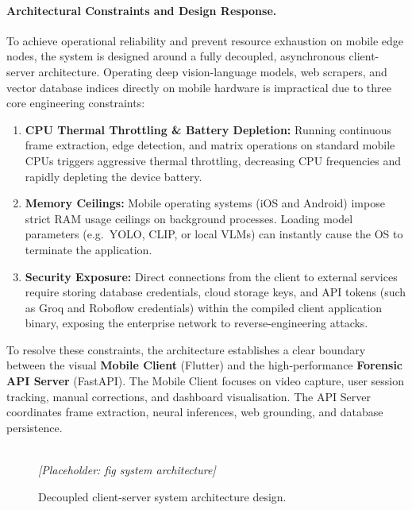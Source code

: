 \paragraph{Architectural Constraints and Design Response.}

To achieve operational reliability and prevent resource exhaustion on mobile edge nodes, the system is designed around a fully decoupled, asynchronous client-server architecture. Operating deep vision-language models, web scrapers, and vector database indices directly on mobile hardware is impractical due to three core engineering constraints:

\begin{enumerate}
  \item \textbf{CPU Thermal Throttling \& Battery Depletion:} Running continuous frame extraction, edge detection, and matrix operations on standard mobile CPUs triggers aggressive thermal throttling, decreasing CPU frequencies and rapidly depleting the device battery.
  \item \textbf{Memory Ceilings:} Mobile operating systems (iOS and Android) impose strict RAM usage ceilings on background processes. Loading model parameters (e.g.\ YOLO, CLIP, or local VLMs) can instantly cause the OS to terminate the application.
  \item \textbf{Security Exposure:} Direct connections from the client to external services require storing database credentials, cloud storage keys, and API tokens (such as Groq and Roboflow credentials) within the compiled client application binary, exposing the enterprise network to reverse-engineering attacks.
\end{enumerate}

To resolve these constraints, the architecture establishes a clear boundary between the visual \textbf{Mobile Client} (Flutter) and the high-performance \textbf{Forensic API Server} (FastAPI). The Mobile Client focuses on video capture, user session tracking, manual corrections, and dashboard visualisation. The API Server coordinates frame extraction, neural inferences, web grounding, and database persistence.

\begin{figure}[htbp]
  \centering
  \framebox[\linewidth]{\rule{0pt}{4cm}}
  \\[4pt]
  {\small\textit{[Placeholder: fig system architecture]}}  
  
  \caption{Decoupled client-server system architecture design.}
  \label{fig:ch4-architecture}
\end{figure}

